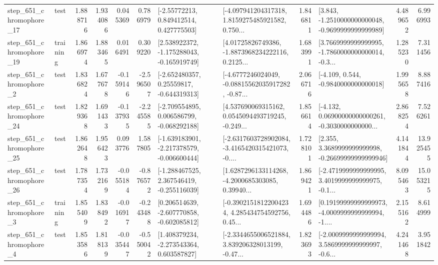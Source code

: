 \begin{tabular}{llrrrrllrlrr}
  step\_651\_chromophore\_17 &      test &      1.888716 &    1.934086 &      0.045369 &  0.786979 &     [-2.55772213, 0.849412514, 0.427775503] &  [-4.097941204317318, 1.8159275485921582, 0.750... &       1.846811 &  [3.843, -1.2510000000000048, -0.9699999999999989] &            4.489652 &          6.996993 \\
  step\_651\_chromophore\_19 &  training &      1.866974 &    1.883465 &      0.016491 &  0.309220 &   [2.538922372, -1.175288043, -0.165919749] &  [4.01725826749386, -1.8873968234222116, 0.2125... &       1.683991 &  [3.7669999999999995, -1.7860000000000014, -0.3... &            1.285230 &          7.311456 \\
   step\_651\_chromophore\_2 &      test &      1.836824 &    1.677678 &     -0.159146 & -2.596507 &    [-2.652480357, 0.25559817, -0.644319313] &  [-4.6777246024049, -0.08815562035917282, -0.87... &       2.066716 &               [-4.109, 0.544, -0.9840000000000018] &            1.995658 &          8.887416 \\
  step\_651\_chromophore\_24 &      test &      1.829368 &    1.691433 &     -0.137935 & -2.245585 &   [-2.709554895, 0.006586799, -0.068292188] &  [4.537690069315162, 0.0545094493719245, -0.249... &       1.856614 &  [-4.132, 0.06900000000000261, -0.3030000000000... &            2.868254 &          7.526261 \\
  step\_651\_chromophore\_25 &      test &      1.862648 &    1.956423 &      0.093776 &  1.587805 &  [-1.639183901, -2.217378579, -0.006600444] &  [-2.6317603728902084, -3.4165420315421073, -0.... &       1.728101 &  [2.355, 3.3689999999999998, -0.26699999999999946] &            4.141844 &         13.925455 \\
  step\_651\_chromophore\_26 &      test &      1.787354 &    1.732169 &     -0.055184 & -0.876572 &   [-1.288467525, 2.367546419, -0.255116039] &  [1.6287296133114268, -4.2000685303085, 0.39940... &       1.869421 &  [-2.4719999999999995, 3.4019999999999975, -0.1... &            8.095463 &         15.053215 \\
   step\_651\_chromophore\_3 &  training &      1.855409 &    1.838492 &     -0.016917 & -0.243488 &   [0.206514639, -2.607770858, -0.602085812] &  [-0.39021518122004234, 4.285434754592756, 0.45... &       1.694486 &  [0.19199999999999973, -4.0009999999999994, -1.... &            2.155162 &          8.614999 \\
   step\_651\_chromophore\_4 &      test &      1.853586 &    1.818139 &     -0.035447 & -0.550042 &    [1.408379234, -2.273543364, 0.603587827] &  [-2.3344655006521884, 3.839206328013199, -0.47... &       1.823693 &  [-2.0009999999999994, 3.5869999999999997, -0.6... &            4.241468 &          3.951842 \\

\end{tabular}
